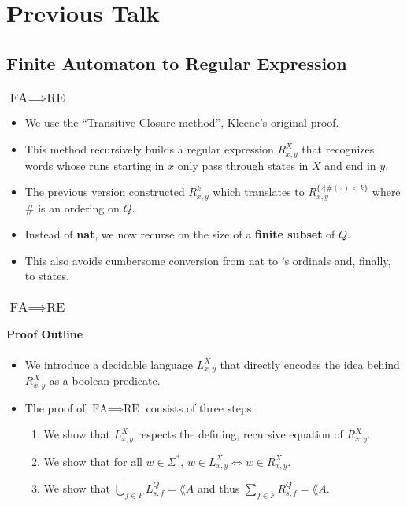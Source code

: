 \documentclass{beamer}
\begin{document}
\section{Previous Talk}
\subsection{Finite Automaton to Regular Expression}
\begin{frame}
    \frametitle{$\mbox{FA} \implies \mbox{RE}$}
    \begin{itemize}
        \item We use the ``Transitive Closure method'', Kleene's original proof.
        \item This method recursively builds a regular expression $R^X_{x,y}$ that recognizes words whose runs starting in $x$ only pass through states in $X$ and end in $y$.
        \item The previous version constructed $R^k_{x,y}$ which translates to $R^{\{z | \#(z) < k\}}_{x,y}$ where $\#$ is an ordering on $Q$.
        \item Instead of \textbf{nat}, we now recurse on the size of a \textbf{finite subset} of $Q$.
        \item This also avoids cumbersome conversion from nat to \ssreflect's ordinals and, finally, to states.
    \end{itemize}
\end{frame}

\begin{frame}
    \frametitle{$\mbox{FA} \implies \mbox{RE}$}
    \framesubtitle{Proof Outline}
    \begin{itemize}
        \item We introduce a decidable language $L^X_{x,y}$ that directly encodes the idea behind $R^{X}_{x,y}$ as a boolean predicate.
        \item The proof of $\mbox{FA} \implies \mbox{RE}$ consists of three steps: 
            \begin{enumerate}
                \item We show that $L^X_{x,y}$ respects the defining, recursive equation of $R^X_{x,y}$.
                \item We show that for all $w \in \Sigma^*$, $w \in L^X_{x,y} \iff w \in R^X_{x,y}$.
                \item We show that $\bigcup_{f \in F} L^Q_{s,f} = \lang{A}$ and thus $\sum_{f \in F} R^Q_{s,f} = \lang{A}$. 
            \end{enumerate}
    \end{itemize}
\end{frame}
\end{document}
